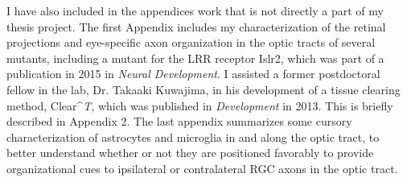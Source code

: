 I have also included in the appendices work that is not directly a part of my thesis project.
The first Appendix includes my characterization of the retinal projections and eye-specific axon organization in the optic tracts of several mutants, including a mutant for the LRR receptor Islr2, which was part of a publication in 2015 in \emph{Neural Development}.
I assisted a former postdoctoral fellow in the lab, Dr. Takaaki Kuwajima, in his development of a tissue clearing method, Clear^\emph{T}, which was published in \emph{Development} in 2013.
This is briefly described in Appendix 2.
The last appendix summarizes some cursory characterization of astrocytes and microglia in and along the optic tract, to better understand whether or not they are positioned favorably to provide organizational cues to ipsilateral or contralateral RGC axons in the optic tract.
